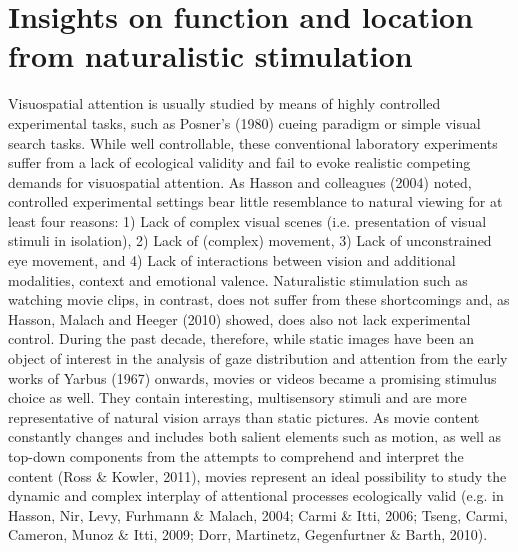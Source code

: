 \documentclass[a4paper, 12pt]{scrreprt}
\begin{document}
\section{Insights on function and location from naturalistic stimulation}\label{section:shortcomings}
Visuospatial attention is usually studied by means of highly controlled experimental tasks, such as Posner’s (1980) cueing paradigm or simple visual search tasks. While well controllable, these conventional laboratory experiments suffer from a lack of ecological validity and fail to evoke realistic competing demands for visuospatial attention. As Hasson and colleagues (2004) noted, controlled experimental settings bear little resemblance to natural viewing for at least four reasons: 1) Lack of complex visual scenes (i.e. presentation of visual stimuli in isolation), 2) Lack of (complex) movement, 3) Lack of unconstrained eye movement, and 4) Lack of interactions between vision and additional modalities, context and emotional valence. Naturalistic stimulation such as watching movie clips, in contrast, does not suffer from these shortcomings and, as Hasson, Malach and Heeger (2010) showed, does also not lack experimental control. During the past decade, therefore, while static images have been an object of interest in the analysis of gaze distribution and attention from the early works of Yarbus (1967) onwards, movies or videos became a promising stimulus choice as well. They contain interesting, multisensory stimuli and are more representative of natural vision arrays than static pictures. As movie content constantly changes and includes both salient elements such as motion, as well as top-down components from the attempts to comprehend and interpret the content (Ross \& Kowler, 2011), movies represent an ideal possibility to study the dynamic and complex interplay of attentional processes ecologically valid   (e.g. in Hasson, Nir, Levy, Furhmann \& Malach, 2004; Carmi \& Itti, 2006; Tseng, Carmi, Cameron, Munoz \& Itti, 2009; Dorr, Martinetz, Gegenfurtner \& Barth, 2010). \newline
\end{document}

